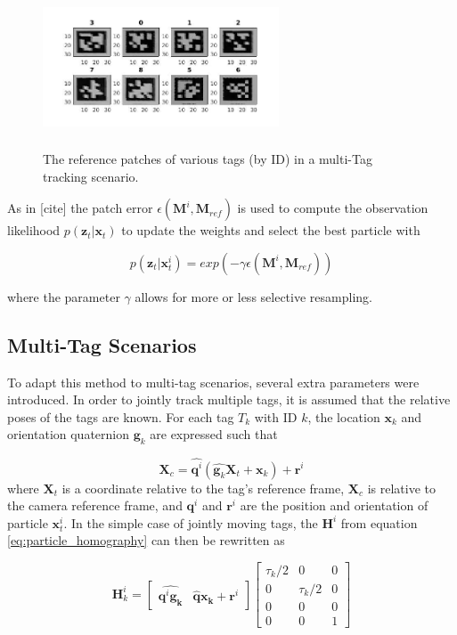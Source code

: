 \documentclass[letterpaper, 10 pt, conference]{ieeeconf}
\renewcommand{\vec}[1]{\boldsymbol{#1}}
\begin{document}
\begin{figure}[b]
	\centering
	\includegraphics[width=7cm,height=4.75cm]{RefPatches}
	\caption{The reference patches of various tags (by ID) in a multi-Tag tracking scenario.}
\end{figure}

As in [cite] the patch error $\epsilon(\vec{M}^{i}, \vec{M}_{ref})$ is used to compute the observation likelihood $p(\vec{z}_t|\vec{x}_t)$ to update the weights and select the best particle with


\begin{equation}
	p(\vec{z}_t|\vec{x}^i_t) = exp(-\gamma \epsilon(\vec{M}^i, \vec{M}_{ref}))
\end{equation}

where the parameter $\gamma$ allows for more or less selective resampling.



\subsection{Multi-Tag Scenarios}

To adapt this method to multi-tag scenarios, several extra parameters were introduced. In order to jointly track multiple tags, it is assumed that the relative poses of the tags are known. For each tag $T_k$ with ID $k$, the location $\vec{x}_{k}$ and orientation quaternion $\vec{g}_{k}$ are expressed such that

\begin{equation}
	\vec{X}_c = \widehat{\vec{q}^i} (\widehat{\vec{g}_k} \vec{X}_t + \vec{x}_k) + \vec{r}^i
\end{equation}
where $\vec{X}_t$ is a coordinate relative to the tag's reference frame, $\vec{X}_c$ is relative to the camera reference frame, and $\vec{q}^i$ and $\vec{r}^i$ are the position and orientation of particle $\vec{x}^i_t$. In the simple case of jointly moving tags, the $\vec{H}^i$ from equation \ref{eq:particle_homography} can then be rewritten as


\begin{equation}
	\vec{H}^i_{k} =
	\begin{bmatrix}
		\widehat{\vec{q}^i \vec{g_k}} & \widehat{\vec{q}} \vec{x_k} + \vec{r}^i
	\end{bmatrix}\begin{bmatrix}
		\tau_k/2 & 0 & 0 \\
		0 & \tau_k/2 & 0 \\
		0 & 0 & 0 \\
		0 & 0 & 1
	\end{bmatrix}
\end{equation}
\end{document}
